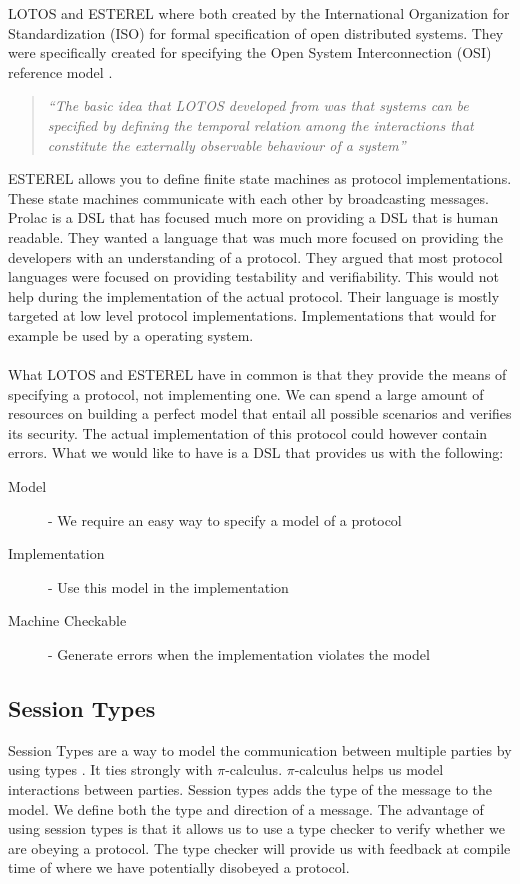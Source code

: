 LOTOS and ESTEREL where both created by the International Organization for Standardization (ISO) for formal specification of open distributed systems. They were specifically created for specifying the Open System Interconnection (OSI) reference model \cite{day1983osi}.
\begin{quote}
	\textit{``The basic idea that LOTOS developed from was that systems can be specified by defining the temporal relation among the interactions that constitute the externally observable behaviour
of a system''}
	\begin{flushright}
		\cite{bolognesi1987introduction}
	\end{flushright}		
\end{quote}
ESTEREL allows you to define finite state machines as protocol implementations. These state machines communicate with each other by broadcasting messages.
\\
Prolac is a DSL that has focused much more on providing a DSL that is human readable. They wanted a language that was much more focused on providing the developers with an understanding of a protocol. They argued that most protocol languages were focused on providing testability and verifiability. This would not help during the implementation of the actual protocol. Their language is mostly targeted at low level protocol implementations. Implementations that would for example be used by a operating system.
\\\\
What LOTOS and ESTEREL have in common is that they provide the means of specifying a protocol, not implementing one. We can spend a large amount of resources on building a perfect model that entail all possible scenarios and verifies its security. The actual implementation of this protocol could however contain errors. What we would like to have is a DSL that provides us with the following:
\begin{description}
  \item[Model] - We require an easy way to specify a model of a protocol
  \item[Implementation] - Use this model in the implementation   
  \item[Machine Checkable] - Generate errors when the implementation violates the model
\end{description}

\subsection{Session Types}
Session Types are a way to model the communication between multiple parties by using types \cite{dardha2012session}. It ties strongly with $\pi$-calculus. $\pi$-calculus helps us model interactions between parties. Session types adds the type of the message to the model. We define both the type and direction of a message. The advantage of using session types is that it allows us to use a type checker to verify whether we are obeying a protocol. The type checker will provide us with feedback at compile time of where we have potentially disobeyed a protocol.

